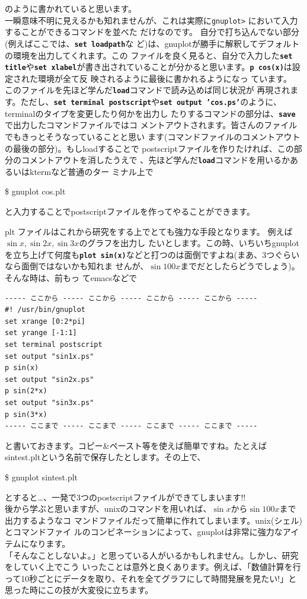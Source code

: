 \documentclass[a4j]{ujarticle} %
\newenvironment{terminal}{%
  \begin{center}
   \begin{minipage}{.8\textwidth}
    \setlength{\FrameSep}{.5\FrameSep}%
    \begin{framed}\ttfamily\small%
     \setlength\baselineskip{.85\baselineskip}%
}{%
    \end{framed}
   \end{minipage}
  \end{center}%
}
\begin{document}
のように書かれていると思います。\\
一瞬意味不明に見えるかも知れませんが、これは実際に{\tt gnuplot>} において入力することができるコマンドを並べた
 だけなのです。 自分で打ち込んでない部分(例えばここでは、{\tt \bf set loadpath}な
 ど)は、gnuplotが勝手に解釈してデフォルトの環境を出力してくれます。この
 ファイルを良く見ると、自分で入力した{\tt \bf set title}や{\tt \bf set
 xlabel}が書き出されていることが分かると思います。{\tt \bf p cos(x)}は設定された環境が全て反
 映されるように最後に書かれるようになっ ています。\\
このファイルを先ほど学んだ{\tt\bf load}コマンドで読み込めば同じ状況が
再現されます。ただし、{\tt\bf set terminal postscript}や{\tt\bf set
output 'cos.ps'}のように、terminalのタイプを変更したり何かを出力し
たりするコマンドの部分は、{\tt\bf save}で出力したコマンドファイルではコ
メントアウトされます。皆さんのファイルでもきっとそうなっていることと思い
ます(コマンドファイルのコメントアウトの最後の部分)。もしloadすることで
postscriptファイルを作りたければ、この部分のコメントアウトを消したうえで
、先ほど学んだ{\tt\bf load}コマンドを用いるかあるいはktermなど普通のター
ミナル上で
\begin{terminal}
\$ gnuplot cos.plt
\end{terminal}
と入力することでpostscriptファイルを作ってやることができます。

plt ファイルはこれから研究をする上でとても強力な手段となります。
例えば$\sin{x},\sin{2x},\sin{3x}$のグラフを出力し
たいとします。この時、いちいちgnuplotを立ち上げて何度も{\tt \bf plot
sin(x)}などと打つのは面倒ですよね(まあ、3つぐらいなら面倒ではないかも知れま
せんが、$\sin{100 x}$までだとしたらどうでしょう)。そんな時は、前もっ
てemacsなどで
\begin{verbatim}
----- ここから ----- ここから ----- ここから ----- ここから -----
#! /usr/bin/gnuplot
set xrange [0:2*pi]
set yrange [-1:1]
set terminal postscript
set output "sin1x.ps"
p sin(x)
set output "sin2x.ps"
p sin(2*x)
set output "sin3x.ps"
p sin(3*x)
----- ここまで ----- ここまで ----- ここまで ----- ここまで -----
\end{verbatim}
と書いておきます。コピー\&ペースト等を使えば簡単ですね。たとえば
sintest.pltという名前で保存したとします。その上で、
\begin{terminal}
\$ gnuplot sintest.plt
\end{terminal}
とすると…、一発で3つのpostscriptファイルができてしまいます!!\\
後から学ぶと思いますが、unixのコマンドを用いれば、$\sin{x}$から$\sin{100x}$まで出力するようなコ
マンドファイルだって簡単に作れてしまいます。unix(シェル)とコマンドファイ
ルのコンビネーションによって、gnuplotは非常に強力なアイテムになります。
\\
「そんなことしないよ。」と思っている人がいるかもしれません。しかし、研究をしていく上でこう
いったことは意外と良くあります。例えば、「数値計算を行って10秒ごとにデータを取り、それを全てグラフにして時間発展を見たい!」と
思った時にこの技が大変役に立ちます。\\\\
\end{document}

